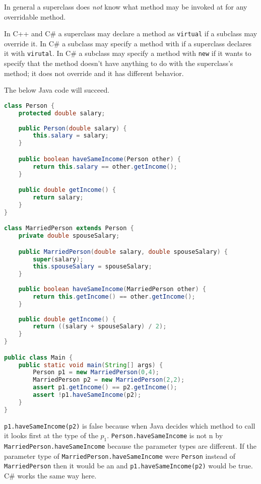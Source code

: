 \documentclass{article}
\begin{document}
In general a superclass does \textit{not} know what method may be invoked at \runtime{} for any overridable method.

In C++ and C\# a superclass may declare a method as \texttt{virtual} if a subclass may override it. In C\# a subclass may specify a method with \texttt{\override{}} if a superclass declares it with \texttt{virutal}. In C\# a subclass may specify a method with \texttt{new} if it wants to specify that the method doesn't have anything to do with the superclass's method; it does not override and it has different behavior.

\begin{example}
  The below Java code will succeed.
\begin{lstlisting}[language=Java, escapechar=|]
class Person {
    protected double salary;
    
    public Person(double salary) {
        this.salary = salary;
    }

    public boolean haveSameIncome(Person other) {
        return this.salary == other.getIncome();
    }

    public double getIncome() {
        return salary;
    }
}

class MarriedPerson extends Person {
    private double spouseSalary;

    public MarriedPerson(double salary, double spouseSalary) {
        super(salary);
        this.spouseSalary = spouseSalary;
    }
    
    public boolean haveSameIncome(MarriedPerson other) {
        return this.getIncome() == other.getIncome();
    }
    
    public double getIncome() {
        return ((salary + spouseSalary) / 2);
    }
}

public class Main {
    public static void main(String[] args) {
        Person p1 = new MarriedPerson(0,4);
        MarriedPerson p2 = new MarriedPerson(2,2);
        assert p1.getIncome() == p2.getIncome();
        assert !p1.haveSameIncome(p2);
    }
}
\end{lstlisting}
  \texttt{p1.haveSameIncome(p2)} is false because when Java decides which method to call it looks first at the \static{} type of the \receiver{} $p_1$.
  \texttt{Person.haveSameIncome} is not \override{}n by \texttt{MarriedPerson.haveSameIncome} because the parameter types are different.
  If the parameter type of \texttt{MarriedPerson.haveSameIncome} were \texttt{Person} instead of \texttt{MarriedPerson} then it would be an \override{} and \texttt{p1.haveSameIncome(p2)} would be true.
  C\# works the same way here.
\end{example}
\end{document}

